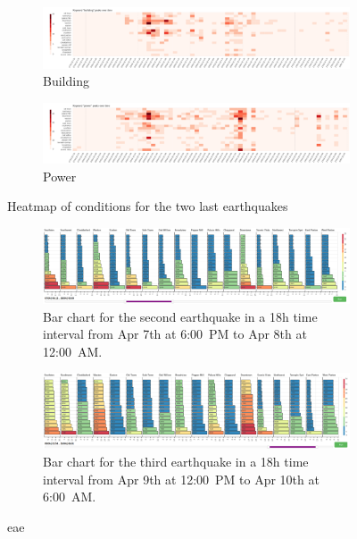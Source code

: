 \begin{figure}[!h]
\begin{subfigure}[!h]{0.96\textwidth}
        \includegraphics[width=1.00\textwidth]{figs/q2/build_2_3_heat.png}
        \caption{Building}
        \label{fig:building_2_3_heat}
    \end{subfigure}
    \begin{subfigure}[!h]{0.96\textwidth}
        \centering
        \includegraphics[width=1.00\textwidth]{figs/q2/power_2_3_heat.png}
        \caption{Power}
        \label{fig:power_2_3_heat}
    \end{subfigure}
    \caption{Heatmap of conditions for the two last earthquakes}
    \label{fig:eq_cond_2_3_heat}
\end{figure}

\begin{figure}[!h]
    \centering
    \begin{subfigure}[!h]{0.98\textwidth}
        \centering
        \includegraphics[width=1.00\textwidth]{figs/q2/eq_2_hbar.png}
        \caption{Bar chart for the second earthquake in a 18h time interval from
        Apr 7th at 6:00~PM to Apr 8th at 12:00~AM.}
        \label{fig:eq_2_hbar}
    \end{subfigure}
    \begin{subfigure}[!h]{0.98\textwidth}
        \centering
        \includegraphics[width=1.00\textwidth]{figs/q2/eq_3_hbar.png}
        \caption{Bar chart for the third earthquake in a 18h time interval from
        Apr 9th at 12:00~PM to Apr 10th at 6:00~AM.}
        \label{fig:eq_3_hbar}
    \end{subfigure}
    \caption{eae}
    \label{fig:eq_2_3_hbar}
\end{figure}

